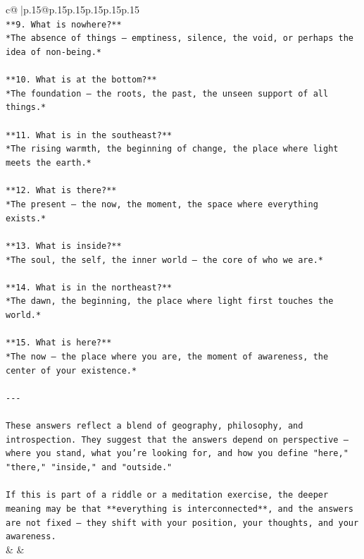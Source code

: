 \documentclass{article}
\begin{document}
{\begin{supertabular}{c@{$\;$}|p{.15\linewidth}@{}p{.15\linewidth}p{.15\linewidth}p{.15\linewidth}p{.15\linewidth}p{.15\linewidth}}
{{{\\ 
\texttt{**9. What is nowhere?**  } \\
\texttt{*The absence of things — emptiness, silence, the void, or perhaps the idea of non{-}being.*} \\
\\ 
\texttt{**10. What is at the bottom?**  } \\
\texttt{*The foundation — the roots, the past, the unseen support of all things.*} \\
\\ 
\texttt{**11. What is in the southeast?**  } \\
\texttt{*The rising warmth, the beginning of change, the place where light meets the earth.*} \\
\\ 
\texttt{**12. What is there?**  } \\
\texttt{*The present — the now, the moment, the space where everything exists.*} \\
\\ 
\texttt{**13. What is inside?**  } \\
\texttt{*The soul, the self, the inner world — the core of who we are.*} \\
\\ 
\texttt{**14. What is in the northeast?**  } \\
\texttt{*The dawn, the beginning, the place where light first touches the world.*} \\
\\ 
\texttt{**15. What is here?**  } \\
\texttt{*The now — the place where you are, the moment of awareness, the center of your existence.*} \\
\\ 
\texttt{{-}{-}{-}} \\
\\ 
\texttt{These answers reflect a blend of geography, philosophy, and introspection. They suggest that the answers depend on perspective — where you stand, what you're looking for, and how you define "here," "there," "inside," and "outside."} \\
\\ 
\texttt{If this is part of a riddle or a meditation exercise, the deeper meaning may be that **everything is interconnected**, and the answers are not fixed — they shift with your position, your thoughts, and your awareness.} \\
            }
        }
    }
    & & \\ \\


\end{supertabular}}
\end{document}
